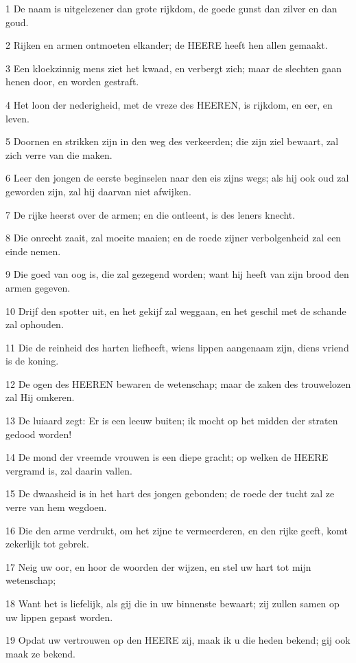 \par 1 De naam is uitgelezener dan grote rijkdom, de goede gunst dan zilver en dan goud.
\par 2 Rijken en armen ontmoeten elkander; de HEERE heeft hen allen gemaakt.
\par 3 Een kloekzinnig mens ziet het kwaad, en verbergt zich; maar de slechten gaan henen door, en worden gestraft.
\par 4 Het loon der nederigheid, met de vreze des HEEREN, is rijkdom, en eer, en leven.
\par 5 Doornen en strikken zijn in den weg des verkeerden; die zijn ziel bewaart, zal zich verre van die maken.
\par 6 Leer den jongen de eerste beginselen naar den eis zijns wegs; als hij ook oud zal geworden zijn, zal hij daarvan niet afwijken.
\par 7 De rijke heerst over de armen; en die ontleent, is des leners knecht.
\par 8 Die onrecht zaait, zal moeite maaien; en de roede zijner verbolgenheid zal een einde nemen.
\par 9 Die goed van oog is, die zal gezegend worden; want hij heeft van zijn brood den armen gegeven.
\par 10 Drijf den spotter uit, en het gekijf zal weggaan, en het geschil met de schande zal ophouden.
\par 11 Die de reinheid des harten liefheeft, wiens lippen aangenaam zijn, diens vriend is de koning.
\par 12 De ogen des HEEREN bewaren de wetenschap; maar de zaken des trouwelozen zal Hij omkeren.
\par 13 De luiaard zegt: Er is een leeuw buiten; ik mocht op het midden der straten gedood worden!
\par 14 De mond der vreemde vrouwen is een diepe gracht; op welken de HEERE vergramd is, zal daarin vallen.
\par 15 De dwaasheid is in het hart des jongen gebonden; de roede der tucht zal ze verre van hem wegdoen.
\par 16 Die den arme verdrukt, om het zijne te vermeerderen, en den rijke geeft, komt zekerlijk tot gebrek.
\par 17 Neig uw oor, en hoor de woorden der wijzen, en stel uw hart tot mijn wetenschap;
\par 18 Want het is liefelijk, als gij die in uw binnenste bewaart; zij zullen samen op uw lippen gepast worden.
\par 19 Opdat uw vertrouwen op den HEERE zij, maak ik u die heden bekend; gij ook maak ze bekend.
